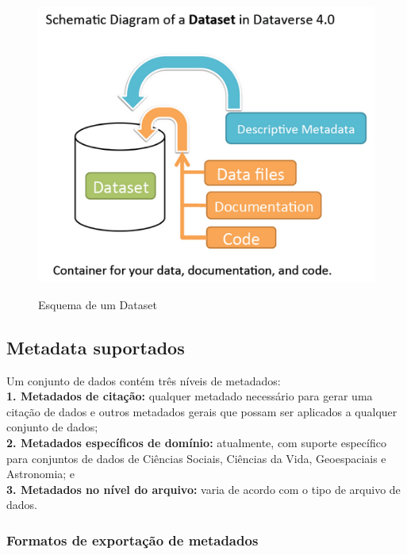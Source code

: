 \documentclass[12pt,hidelinks]{article}
\begin{document}
\begin{figure}[H]
 \caption{Esquema de um Dataset}
                \centering
             \includegraphics[scale=0.5]{imagens/dtset.png}
            \label{Dataset}
        \end{figure}

    \subsection{Metadata suportados}
    
\qquad Um conjunto de dados contém três níveis de metadados:\\

\textbf{1. Metadados de citação:} qualquer metadado necessário para gerar uma citação de dados e outros metadados gerais que possam ser aplicados a qualquer conjunto de dados;\\

\textbf{2. Metadados específicos de domínio:} atualmente, com suporte específico para conjuntos de dados de Ciências Sociais, Ciências da Vida, Geoespaciais e Astronomia; e\\

\textbf{3. Metadados no nível do arquivo:} varia de acordo com o tipo de arquivo de dados.

    
        \subsubsection{Formatos de exportação de metadados}
        
\end{document}
